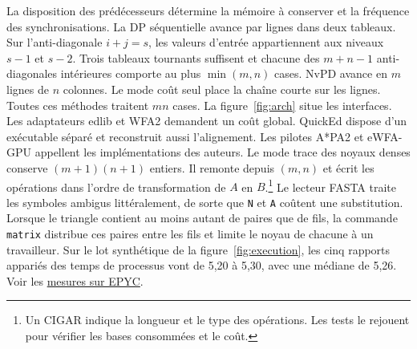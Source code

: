 La disposition des prédécesseurs détermine la mémoire à conserver et la fréquence des synchronisations. La DP séquentielle avance par lignes dans deux tableaux. Sur l'anti-diagonale \(i+j=s\), les valeurs d'entrée appartiennent aux niveaux \(s-1\) et \(s-2\). Trois tableaux tournants suffisent et chacune des \(m+n-1\) anti-diagonales intérieures comporte au plus \(\min(m,n)\) cases. NvPD avance en \(m\) lignes de \(n\) colonnes. Le mode coût seul place la chaîne courte sur les lignes. Toutes ces méthodes traitent \(mn\) cases.
La figure~\ref{fig:arch} situe les interfaces. Les adaptateurs edlib et WFA2 demandent un coût global. QuickEd dispose d'un exécutable séparé et reconstruit aussi l'alignement. Les pilotes A*PA2 et eWFA-GPU appellent les implémentations des auteurs. Le mode trace des noyaux denses conserve \((m+1)(n+1)\) entiers. Il remonte depuis \((m,n)\) et écrit les opérations dans l'ordre de transformation de \(A\) en \(B\).\footnote{Un CIGAR indique la longueur et le type des opérations. Les tests le rejouent pour vérifier les bases consommées et le coût.} Le lecteur FASTA traite les symboles ambigus littéralement, de sorte que \texttt{N} et \texttt{A} coûtent une substitution.
Lorsque le triangle contient au moins autant de paires que de fils, la commande \texttt{matrix} distribue ces paires entre les fils et limite le noyau de chacune à un travailleur. Sur le lot synthétique de la figure~\ref{fig:execution}, les cinq rapports appariés des temps de processus vont de 5,20 à 5,30, avec une médiane de 5,26. Voir les \href{https://github.com/wolf75222/nvpd-edit-distance/blob/main/results/profile/matrix-omp/838652/trials.csv}{mesures sur EPYC}.

